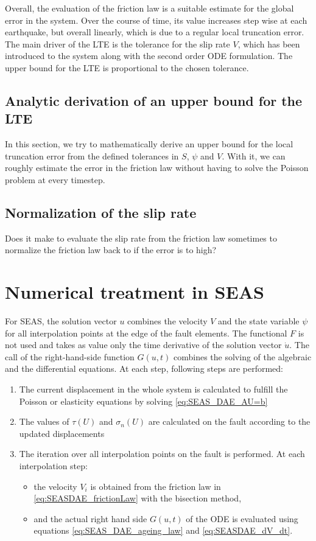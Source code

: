 Overall, the evaluation of the friction law is a suitable estimate for the global error in the system. Over the course of time, its value increases step wise at each earthquake, but overall linearly, which is due to a regular local truncation error. The main driver of the LTE is the tolerance for the slip rate $V$, which has been introduced to the system along with the second order ODE formulation. The upper bound for the LTE is proportional to the chosen tolerance.


\subsection{Analytic derivation of an upper bound for the LTE}
In this section, we try to mathematically derive an upper bound for the local truncation error from the defined tolerances in $S$, $\psi$ and $V$. With it, we can roughly estimate the error in the friction law without having to solve the Poisson problem at every timestep. 

\subsection{Normalization of the slip rate}
Does it make to evaluate the slip rate from the friction law sometimes to normalize the friction law back to if the error is to high? 

\section{Numerical treatment in SEAS}
For SEAS, the solution vector $u$ combines the velocity $V$ and the state variable $\psi$ for all interpolation points at the edge of the fault elements. The functional $F$ is not used and takes as value only the time derivative of the solution vector $\dot{u}$. The call of the right-hand-side function $G(u,t)$ combines the solving of the algebraic and the differential equations. At each step, following steps are performed: 
\begin{enumerate}
    \item The current displacement in the whole system is calculated to fulfill the Poisson or elasticity equations by solving \autoref{eq:SEAS_DAE_AU=b} \\
    \item The values of $\tau(U)$ and $\sigma_n(U)$ are calculated on the fault according to the updated displacements \\
    \item The iteration over all interpolation points on the fault is performed. At each interpolation step: 
    \begin{itemize}
        \item the velocity $V_i$ is obtained from the friction law in \autoref{eq:SEASDAE_frictionLaw} with the bisection method,
        \item and the actual right hand side $G(u,t)$ of the ODE is evaluated using equations \ref{eq:SEAS_DAE_ageing_law} and \ref{eq:SEASDAE_dV_dt}.
    \end{itemize}
\end{enumerate}


